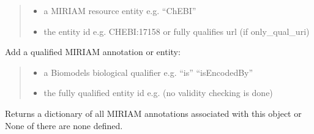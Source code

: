 \documentclass[letterpaper,12pt,english]{sphinxmanual}
\begin{document}
\begin{fulllineitems}
\begin{fulllineitems}
\begin{quote}
\begin{description}
\begin{itemize}
\item {} 
\sphinxAtStartPar
{} \textendash{} a MIRIAM resource entity e.g. “ChEBI”

\item {} 
\sphinxAtStartPar
{} \textendash{} the entity id e.g. CHEBI:17158 or fully qualifies url (if only\_qual\_uri)

\end{itemize}

\end{description}\end{quote}

\end{fulllineitems}


\begin{fulllineitems}
\label{\detokenize{api/core:cbmpy.CBModel.Fbase.addMIRIAMuri}}
\pysigstartsignatures
\pysiglinewithargsret
{}
{\sphinxparamcomma {}}
{}
\pysigstopsignatures
\sphinxAtStartPar
Add a qualified MIRIAM annotation or entity:
\begin{quote}\begin{description}
\begin{itemize}
\item {} 
\sphinxAtStartPar
{} \textendash{} a Biomodels biological qualifier e.g. “is” “isEncodedBy”

\item {} 
\sphinxAtStartPar
{} \textendash{} the fully qualified entity id e.g.  (no validity checking is done)

\end{itemize}

\end{description}\end{quote}

\end{fulllineitems}


\begin{fulllineitems}
\label{\detokenize{api/core:cbmpy.CBModel.Fbase.getMIRIAMannotations}}
\pysigstartsignatures
\pysiglinewithargsret
{}
{}
{}
\pysigstopsignatures
\sphinxAtStartPar
Returns a dictionary of all MIRIAM annotations associated with this object or
None of there are none defined.


\end{fulllineitems}
\end{fulllineitems}
\end{document}
